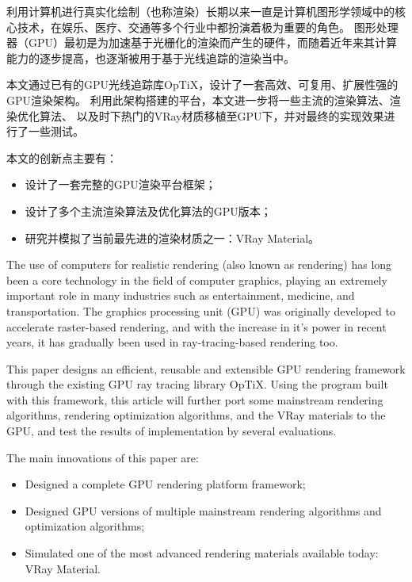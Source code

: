 \begin{cabstract}
  利用计算机进行真实化绘制（也称渲染）长期以来一直是计算机图形学领域中的核心技术，在娱乐、医疗、交通等多个行业中都扮演着极为重要的角色。
  图形处理器（GPU）最初是为加速基于光栅化的渲染而产生的硬件，而随着近年来其计算能力的逐步提高，也逐渐被用于基于光线追踪的渲染当中。

  本文通过已有的GPU光线追踪库OpTiX，设计了一套高效、可复用、扩展性强的GPU渲染架构。
  利用此架构搭建的平台，本文进一步将一些主流的渲染算法、渲染优化算法、
  以及时下热门的VRay材质移植至GPU下，并对最终的实现效果进行了一些测试。

  本文的创新点主要有：
  \begin{itemize}
    \item 设计了一套完整的GPU渲染平台框架；
    \item 设计了多个主流渲染算法及优化算法的GPU版本；
    \item 研究并模拟了当前最先进的渲染材质之一：VRay Material。
  \end{itemize}

\end{cabstract}


\begin{eabstract}

  The use of computers for realistic rendering (also known as rendering) has long been a core technology in the field of computer graphics, playing an extremely important role in many industries such as entertainment, medicine, and transportation.
  The graphics processing unit (GPU) was originally developed to accelerate raster-based rendering, and with the increase in it's power in recent years, it has gradually been used in ray-tracing-based rendering too.

  This paper designs an efficient, reusable and extensible GPU rendering framework through the existing GPU ray tracing library OpTiX.
  Using the program built with this framework, this article will further port some mainstream rendering algorithms, rendering optimization algorithms,
  and the VRay materials to the GPU, and test the results of implementation by several evaluations.

  The main innovations of this paper are:
  \begin{itemize}
    \item Designed a complete GPU rendering platform framework;
    \item Designed GPU versions of multiple mainstream rendering algorithms and optimization algorithms;
    \item Simulated one of the most advanced rendering materials available today: VRay Material.
  \end{itemize} 
\end{eabstract}

